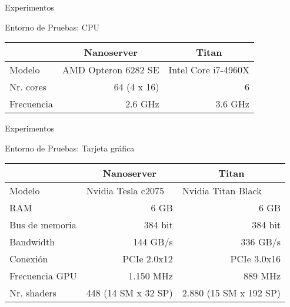 \begin{frame}{Experimentos}
\begin{block}{Entorno de Pruebas: CPU}

\begin{table}[]
\centering
\label{my-label}
\begin{tabular}{lrr}
\toprule
           & \multicolumn{1}{c}{\bf Nanoserver}          & \multicolumn{1}{c}{\bf Titan}               \\
\midrule
Modelo     & \multicolumn{1}{l}{AMD Opteron 6282 SE} & \multicolumn{1}{l}{Intel Core i7-4960X} \\
Nr. cores  & 64 (4 x 16)                             & 6                                       \\
Frecuencia & 2.6 GHz                                 & 3.6 GHz      \\  
\bottomrule
\end{tabular}
\end{table}

\end{block}
\end{frame}


\begin{frame}{Experimentos}
\begin{block}{Entorno de Pruebas: Tarjeta gráfica}

\begin{table}[]
\centering
\label{my-label}
\begin{tabular}{lrr}
\toprule
               & \multicolumn{1}{c}{\textbf{Nanoserver}} & \multicolumn{1}{c}{\textbf{Titan}}     \\
\midrule
Modelo         & \multicolumn{1}{l}{Nvidia Tesla c2075}  & \multicolumn{1}{l}{Nvidia Titan Black} \\
RAM            & 6 GB                                    & 6 GB                                   \\
Bus de memoria & 384 bit                                 & 384 bit                                \\
Bandwidth      & 144 GB/s                                & 336 GB/s                               \\
Conexión       & PCIe 2.0x12                             & PCIe 3.0x16                            \\
Frecuencia GPU & 1.150 MHz                               & 889 MHz                                \\
Nr. shaders    & 448 (14 SM x 32 SP)                     & 2.880 (15 SM x 192 SP)                \\
\bottomrule
\end{tabular}
\end{table}

\end{block}
\end{frame}

